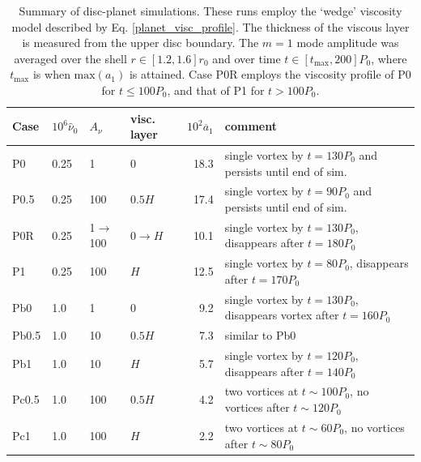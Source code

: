 \begin{table}
  \centering
  \caption{Summary of disc-planet simulations. These runs employ the
    `wedge' viscosity model described by
    Eq. \ref{planet_visc_profile}. The thickness of the viscous layer
    is measured from the upper disc boundary. The $m=1$ mode amplitude was 
    averaged over the shell $r\in[1.2,1.6]r_0$ and over time 
    $t\in[t_\mathrm{max},200]P_0$, where $t_\mathrm{max}$ is when
    $\mathrm{max}(a_1)$ is attained. Case P0R employs the
    viscosity profile of P0 for $t\leq100P_0$, and that of P1 for 
    $t>100P_0$.\label{planet_sims}}
    \begin{tabular}{llllrl}
      \hline\hline
      Case & $10^6\hat{\nu}_0$ & $A_\nu$ & visc. layer&
      $10^2\overline{a}_1$ & comment \\ 
      \hline
      P0     & 0.25  & 1            & 0     & 18.3  &  single vortex
       by $t=130P_0$ and persists until end of sim.  \\ %
      P0.5   & 0.25  & 100          & $0.5H$ &  17.4   & single vortex
      by $t=90P_0$ and persists until end of sim.\\ 
      P0R    & 0.25  & 1$\to$100    & $0\to H$& 10.1 &  single vortex
      by $t=130P_0$, disappears after $t=180P_0$ \\
      P1     & 0.25  & 100          & $H$    & 12.5  &  single vortex
      by $t=80P_0$, disappears after $t=170P_0$ \\   %
      

      Pb0     & 1.0  & 1          & 0      & 9.2  & single vortex by $t=130P_0$, disappears
      vortex after $t=160P_0$   \\ %
      Pb0.5   & 1.0  & 10         & $0.5H$ & 7.3  & similar to Pb0     \\ 
      Pb1     & 1.0  & 10         & $H$    & 5.7  &    single vortex
      by $t=120P_0$, disappears after $t=140P_0$   \\ %

      Pc0.5   & 1.0  & 100          & $0.5H$ & 4.2  &  two vortices
      at $t\sim100P_0$, no vortices after $t\sim120P_0$   \\ %
      Pc1     & 1.0  & 100          & $H$    & 2.2 &   two vortices at
      $t\sim60P_0$, no vortices after $t\sim 80P_0$\\ %
      \hline
  \end{tabular}
\end{table}


